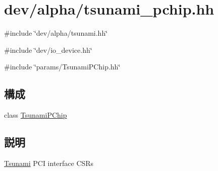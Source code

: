 \hypertarget{tsunami__pchip_8hh}{
\section{dev/alpha/tsunami\_\-pchip.hh}
\label{tsunami__pchip_8hh}
}
{\ttfamily \#include \char`\"{}dev/alpha/tsunami.hh\char`\"{}}\par
{\ttfamily \#include \char`\"{}dev/io\_\-device.hh\char`\"{}}\par
{\ttfamily \#include \char`\"{}params/TsunamiPChip.hh\char`\"{}}\par
\subsection*{構成}
\begin{DoxyCompactItemize}
\item 
class \hyperlink{classTsunamiPChip}{TsunamiPChip}
\end{DoxyCompactItemize}


\subsection{説明}
\hyperlink{classTsunami}{Tsunami} PCI interface CSRs 
